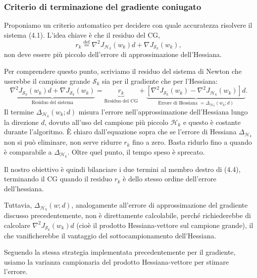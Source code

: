 \documentclass[a4paper,12pt]{article}
\begin{document}
\subsubsection{Criterio di terminazione del gradiente coniugato}

Proponiamo un criterio automatico per decidere con quale accuratezza risolvere il sistema (4.1). L'idea chiave è che il residuo del CG,
\[
r_k \stackrel{\mathrm{def}}{=} \nabla^2 J_{\mathcal{H}_k}(w_k) d + \nabla J_{\mathcal{S}_k}(w_k), \tag{4.3}
\]
non deve essere più piccolo dell'errore di approssimazione dell'Hessiana.

Per comprendere questo punto, scriviamo il residuo del sistema di Newton che userebbe il campione grande \(\mathcal{S}_k\) sia per il gradiente che per l'Hessiana:
\[
\underbrace{\nabla^2 J_{\mathcal{S}_k}(w_k) d + \nabla J_{\mathcal{S}_k}(w_k)}_{\text{Residuo del sistema}}
= \underbrace{r_k}_{\text{Residuo del CG}} + \underbrace{\left[\nabla^2 J_{\mathcal{S}_k}(w_k) - \nabla^2 J_{\mathcal{H}_k}(w_k)\right] d}_{\text{Errore di Hessiana }= \Delta_{\mathcal{H}_k}(w_k; d)}. \tag{4.4}
\]
Il termine \(\Delta_{\mathcal{H}_k}(w_k; d)\) misura l'errore nell'approssimazione dell'Hessiana lungo la direzione \(d\), dovuto all'uso del campione più piccolo \(\mathcal{H}_k\) e questo è costante durante l'algoritmo. È chiaro dall'equazione sopra che se l'errore di Hessiana \(\Delta_{\mathcal{H}_k}\) non si può eliminare, non serve ridurre \(r_k\) fino a zero. Basta ridurlo fino a quando è comparabile a \(\Delta_{\mathcal{H}_k}\). Oltre quel punto, il tempo speso è sprecato.

Il nostro obiettivo è quindi bilanciare i due termini al membro destro di (4.4), terminando il CG quando il residuo \(r_k\) è dello stesso ordine dell'errore dell'hessiana.

Tuttavia, \(\Delta_{\mathcal{H}_k}(w; d)\), analogamente all'errore di approssimazione del gradiente discusso precedentemente, non è direttamente calcolabile, perché richiederebbe di calcolare \(\nabla^2 J_{\mathcal{S}_k}(w_k)d\) (cioè il prodotto Hessiana-vettore sul campione grande), il che vanificherebbe il vantaggio del sottocampionamento dell'Hessiana.

Seguendo la stessa strategia implementata precedentemente per il gradiente, usiamo la varianza campionaria del prodotto Hessiana-vettore per stimare l'errore. 
\end{document}
